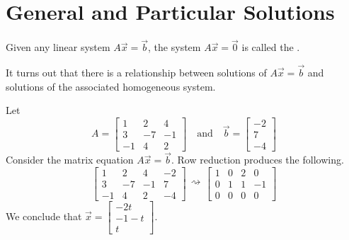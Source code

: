 \documentclass{ximera}
\begin{document}
\section*{General and Particular Solutions}

\begin{definition} Given any linear system $A\vec{x}=\vec{b}$, the system $A\vec{x}=\vec{0}$ is called the .
\end{definition}

It turns out that there is a relationship between solutions of $A\vec{x}=\vec{b}$ and solutions of the associated homogeneous system.

\begin{initprob}\label{init:generalplusparticular}
Let $$A=\begin{bmatrix}1&2&4\\3&-7&-1\\-1&4&2\end{bmatrix}\quad\text{and}\quad\vec{b}=\begin{bmatrix}-2\\7\\-4\end{bmatrix}$$
Consider the matrix equation $A\vec{x}=\vec{b}$.  Row reduction produces the following.
$$\left[\begin{array}{ccc|c}  
 1&2&4&-2\\3&-7&-1&7\\-1&4&2&-4
 \end{array}\right]\begin{array}{c}
 \\
 \rightsquigarrow\\
 \\
 \end{array}\left[\begin{array}{ccc|c}  
 1&0&2&0\\0&1&1&-1\\0&0&0&0
 \end{array}\right]$$
 We conclude that $\vec{x}=\begin{bmatrix}-2t\\-1-t\\t\end{bmatrix}$.  
 

\end{initprob}
\end{document}
